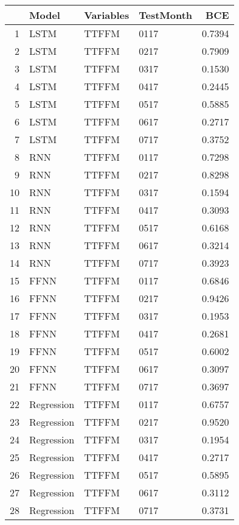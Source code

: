 \begin{table}[ht]
\centering
\begin{tabular}{rlllr}
  \hline
 & Model & Variables & TestMonth & BCE \\ 
  \hline
1 & LSTM & TTFFM  & 0117 & 0.7394 \\ 
  2 & LSTM & TTFFM  & 0217 & 0.7909 \\ 
  3 & LSTM & TTFFM  & 0317 & 0.1530 \\ 
  4 & LSTM & TTFFM  & 0417 & 0.2445 \\ 
  5 & LSTM & TTFFM  & 0517 & 0.5885 \\ 
  6 & LSTM & TTFFM  & 0617 & 0.2717 \\ 
  7 & LSTM & TTFFM  & 0717 & 0.3752 \\ 
  8 & RNN & TTFFM  & 0117 & 0.7298 \\ 
  9 & RNN & TTFFM  & 0217 & 0.8298 \\ 
  10 & RNN & TTFFM  & 0317 & 0.1594 \\ 
  11 & RNN & TTFFM  & 0417 & 0.3093 \\ 
  12 & RNN & TTFFM  & 0517 & 0.6168 \\ 
  13 & RNN & TTFFM  & 0617 & 0.3214 \\ 
  14 & RNN & TTFFM  & 0717 & 0.3923 \\ 
  15 & FFNN & TTFFM  & 0117 & 0.6846 \\ 
  16 & FFNN & TTFFM  & 0217 & 0.9426 \\ 
  17 & FFNN & TTFFM  & 0317 & 0.1953 \\ 
  18 & FFNN & TTFFM  & 0417 & 0.2681 \\ 
  19 & FFNN & TTFFM  & 0517 & 0.6002 \\ 
  20 & FFNN & TTFFM  & 0617 & 0.3097 \\ 
  21 & FFNN & TTFFM  & 0717 & 0.3697 \\ 
  22 & Regression & TTFFM  & 0117 & 0.6757 \\ 
  23 & Regression & TTFFM  & 0217 & 0.9520 \\ 
  24 & Regression & TTFFM  & 0317 & 0.1954 \\ 
  25 & Regression & TTFFM  & 0417 & 0.2717 \\ 
  26 & Regression & TTFFM  & 0517 & 0.5895 \\ 
  27 & Regression & TTFFM  & 0617 & 0.3112 \\ 
  28 & Regression & TTFFM  & 0717 & 0.3731 \\ 

\end{tabular}
\end{table}
